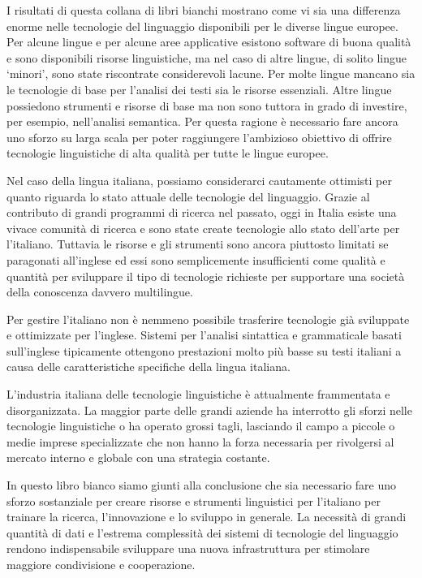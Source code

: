 \documentclass[]{../../metanetpaper}
\begin{document}
\begin{multicols}{2}
I risultati di questa collana di libri bianchi mostrano come vi sia una differenza enorme nelle tecnologie del  linguaggio disponibili per le diverse lingue europee. Per alcune lingue e per alcune aree applicative esistono software di buona qualit\`{a} e sono disponibili risorse linguistiche, ma nel caso di altre lingue, di solito lingue `minori', sono state riscontrate considerevoli lacune. Per molte lingue mancano sia le tecnologie di base per l'analisi dei testi sia le risorse essenziali. Altre lingue possiedono strumenti e risorse di base ma non sono tuttora in grado di investire, per esempio, nell'analisi semantica. Per questa ragione \`{e} necessario fare ancora uno sforzo su larga scala per poter raggiungere l'ambizioso obiettivo di offrire tecnologie linguistiche di alta qualit\`{a} per tutte le lingue europee.

Nel caso della lingua italiana, possiamo considerarci cautamente ottimisti per
quanto riguarda lo stato attuale delle tecnologie del linguaggio. Grazie al
contributo di grandi programmi di ricerca nel passato, oggi in Italia esiste
una vivace comunit\`{a} di ricerca e sono state create tecnologie allo stato
dell'arte per l'italiano. Tuttavia le risorse e gli strumenti sono ancora
piuttosto limitati se paragonati all'inglese ed essi sono semplicemente
insufficienti come qualit\`{a} e quantit\`{a} per sviluppare il tipo di
tecnologie richieste per supportare una societ\`{a} della conoscenza davvero
multilingue.

Per gestire l'italiano non \`{e} nemmeno possibile trasferire tecnologie
gi\`{a} sviluppate e ottimizzate per l'inglese. Sistemi per l'analisi
sintattica e grammaticale basati sull'inglese tipicamente ottengono
prestazioni molto pi\`{u} basse su testi italiani a causa delle
caratteristiche specifiche della lingua italiana.

L'industria italiana delle tecnologie linguistiche \`{e} attualmente
frammentata e disorganizzata. La maggior parte delle grandi aziende ha
interrotto gli sforzi nelle tecnologie linguistiche o ha operato grossi
tagli, lasciando il campo a piccole o medie imprese specializzate che non
hanno la forza necessaria per rivolgersi al mercato interno e globale con una
strategia costante. 

In questo libro bianco siamo giunti alla conclusione che sia necessario fare
uno sforzo sostanziale per creare risorse e strumenti linguistici per l'italiano per trainare la
ricerca, l'innovazione e lo sviluppo in generale. La necessit\`{a} di grandi
quantit\`{a} di dati e l'estrema complessit\`{a} dei sistemi di tecnologie del
linguaggio rendono
indispensabile sviluppare una nuova infrastruttura per stimolare maggiore
condivisione e cooperazione. 


\end{multicols}
\end{document}
